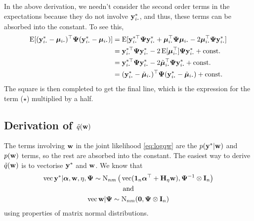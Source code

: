 \begin{remark}
  In the above derivation,  we needn't consider the second order terms in the expectations because they do not involve $\by^*_{i \bigcdot}$, and thus, these terms can be absorbed into the constant.
  To see this,
  \begin{align*}
    \E[(\by^*_{i \bigcdot} - \bmu_{i \bigcdot})^\top \bPsi (\by^*_{i \bigcdot} - \bmu_{i \bigcdot})]
    &= \E[\by^{*\top}_{i \bigcdot}\bPsi \by^*_{i \bigcdot} + \bmu_{i \bigcdot}^\top \bPsi \bmu_{i \bigcdot} - 2\bmu_{i \bigcdot}^\top\bPsi\by^*_{i \bigcdot}] \\
    &= \by^{*\top}_{i \bigcdot}\bPsi \by^*_{i \bigcdot} - 2 \E[\bmu_{i \bigcdot}^\top] \bPsi \by^*_{i \bigcdot} + \const \\
    &= \by^{*\top}_{i \bigcdot} \bPsi \by^*_{i \bigcdot} - 2 \tilde\bmu_{i \bigcdot} ^\top\bPsi\by^*_{i \bigcdot} + \const \\
    &= (\by^*_{i \bigcdot} - \tilde\bmu_{i \bigcdot})^\top \bPsi (\by^*_{i \bigcdot} - \tilde\bmu_{i \bigcdot}) + \const
  \end{align*}
  The square is then completed to get the final line, which is the expression for the term ($\star$) multiplied by a half.
\end{remark}


\subsection{Derivation of \texorpdfstring{$\tilde q({\mathbf w})$}{$\tilde q(w)$}}
\label{apx:qw}

The terms involving ${\mathbf w}$ in the joint likelihood \cref{eq:logqw} are the $p({\mathbf y}^*|{\mathbf w})$ and $p({\mathbf w})$ terms, so the rest are absorbed into the constant.
The easiest way to derive $\tilde q({\mathbf w})$ is to vectorise ${\mathbf y}^*$ and ${\mathbf w}$.
We know that
\begin{gather*}
  \operatorname{vec} {\mathbf y}^* |  {\bm\alpha},{\mathbf w},\eta,{\bm\Psi} \sim \operatorname{N}_{nm}\big(\operatorname{vec} ({\mathbf 1}_n{\bm\alpha}^\top + {\mathbf H}_\eta{\mathbf w}), {\bm\Psi}^{-1}\otimes{\mathbf I}_n\big) \\
  \text{and}\\
  \operatorname{vec} {\mathbf w} | {\bm\Psi} \sim \operatorname{N}_{nm} ({\mathbf 0}, {\bm\Psi}\otimes{\mathbf I}_n)
\end{gather*}
using properties of matrix normal distributions.

